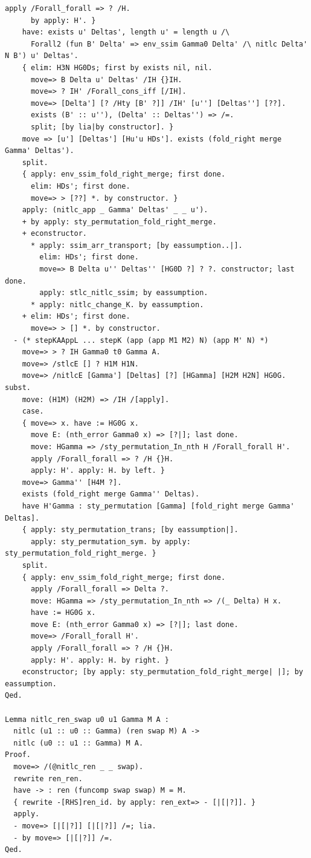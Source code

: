 \begin{lstlisting}[style=authorcoq]
      apply /Forall_forall => ? /H.
      by apply: H'. }
    have: exists u' Deltas', length u' = length u /\
      Forall2 (fun B' Delta' => env_ssim Gamma0 Delta' /\ nitlc Delta' N B') u' Deltas'.
    { elim: H3N HG0Ds; first by exists nil, nil.
      move=> B Delta u' Deltas' /IH {}IH.
      move=> ? IH' /Forall_cons_iff [/IH].
      move=> [Delta'] [? /Hty [B' ?]] /IH' [u''] [Deltas''] [??].
      exists (B' :: u''), (Delta' :: Deltas'') => /=.
      split; [by lia|by constructor]. }
    move => [u'] [Deltas'] [Hu'u HDs']. exists (fold_right merge Gamma' Deltas').
    split.
    { apply: env_ssim_fold_right_merge; first done.
      elim: HDs'; first done.
      move=> > [??] *. by constructor. }
    apply: (nitlc_app _ Gamma' Deltas' _ _ u').
    + by apply: sty_permutation_fold_right_merge.
    + econstructor.
      * apply: ssim_arr_transport; [by eassumption..|].
        elim: HDs'; first done.
        move=> B Delta u'' Deltas'' [HG0D ?] ? ?. constructor; last done.
        apply: stlc_nitlc_ssim; by eassumption.
      * apply: nitlc_change_K. by eassumption.
    + elim: HDs'; first done.
      move=> > [] *. by constructor.
  - (* stepKAAppL ... stepK (app (app M1 M2) N) (app M' N) *)
    move=> > ? IH Gamma0 t0 Gamma A.
    move=> /stlcE [] ? H1M H1N.
    move=> /nitlcE [Gamma'] [Deltas] [?] [HGamma] [H2M H2N] HG0G. subst.
    move: (H1M) (H2M) => /IH /[apply].
    case.
    { move=> x. have := HG0G x.
      move E: (nth_error Gamma0 x) => [?|]; last done.
      move: HGamma => /sty_permutation_In_nth H /Forall_forall H'.
      apply /Forall_forall => ? /H {}H.
      apply: H'. apply: H. by left. }
    move=> Gamma'' [H4M ?].
    exists (fold_right merge Gamma'' Deltas).
    have H'Gamma : sty_permutation [Gamma] [fold_right merge Gamma' Deltas].
    { apply: sty_permutation_trans; [by eassumption|].
      apply: sty_permutation_sym. by apply: sty_permutation_fold_right_merge. }
    split.
    { apply: env_ssim_fold_right_merge; first done.
      apply /Forall_forall => Delta ?.
      move: HGamma => /sty_permutation_In_nth => /(_ Delta) H x.
      have := HG0G x.
      move E: (nth_error Gamma0 x) => [?|]; last done.
      move=> /Forall_forall H'.
      apply /Forall_forall => ? /H {}H.
      apply: H'. apply: H. by right. }
    econstructor; [by apply: sty_permutation_fold_right_merge| |]; by eassumption.
Qed.

Lemma nitlc_ren_swap u0 u1 Gamma M A :
  nitlc (u1 :: u0 :: Gamma) (ren swap M) A ->
  nitlc (u0 :: u1 :: Gamma) M A.
Proof.
  move=> /(@nitlc_ren _ _ swap).
  rewrite ren_ren.
  have -> : ren (funcomp swap swap) M = M.
  { rewrite -[RHS]ren_id. by apply: ren_ext=> - [|[|?]]. }
  apply.
  - move=> [|[|?]] [|[|?]] /=; lia.
  - by move=> [|[|?]] /=.
Qed.


\end{lstlisting}
